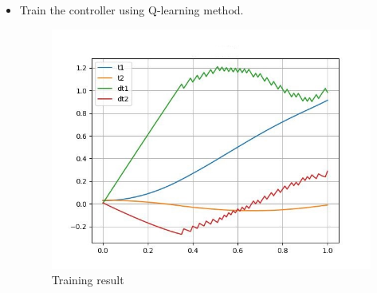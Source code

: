 \documentclass{beamer}
\begin{document}
    \begin{frame}
        \frametitle{\secname}

        \begin{itemize}
            \item Train the controller using Q-learning method.
            \begin{figure}
                \includegraphics[scale=.3]{Figs/train2.jpg}
                \caption{Training result}
            \end{figure}
        \end{itemize}
    \end{frame}
\end{document}
